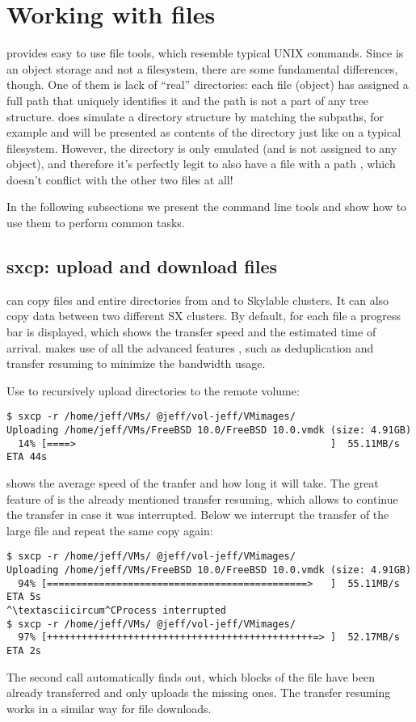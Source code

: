 \section{Working with files} \label{sec:files}
\SX provides easy to use file tools, which resemble typical UNIX commands.
Since \SX is an object storage and not a filesystem, there are some
fundamental differences, though. One of them is lack of ``real'' directories:
each file (object) has assigned a full path that uniquely identifies it and
the path is not a part of any tree structure. \SX does simulate a directory
structure by matching the subpaths, for example 
and  will be presented as contents of the directory
 just like on a typical filesystem. However, the directory
 is only emulated (and is not assigned to any object), and
therefore it's perfectly legit to also have a file with a path ,
which doesn't conflict with the other two files at all! 

In the following subsections we present the command line tools and show
how to use them to perform common tasks.

\subsection{sxcp: upload and download files}
 can copy files and entire directories from and to Skylable \SX
clusters. It can also copy data between two different SX clusters. By default,
for each file a progress bar is displayed, which shows the transfer speed and
the estimated time of arrival.  makes use of all the advanced features \SX,
such as deduplication and transfer resuming to minimize the bandwidth usage.

Use  to recursively upload directories to the remote volume:
\begin{lstlisting}
$ sxcp -r /home/jeff/VMs/ @jeff/vol-jeff/VMimages/
Uploading /home/jeff/VMs/FreeBSD 10.0/FreeBSD 10.0.vmdk (size: 4.91GB)
  14% [====>                                            ]  55.11MB/s ETA 44s
\end{lstlisting}
 shows the average speed of the tranfer and how long it will take.
The great feature of \SX is the already mentioned transfer resuming, which
allows to continue the transfer in case it was interrupted. Below we interrupt
the transfer of the large file and repeat the same copy again:
\begin{lstlisting}
$ sxcp -r /home/jeff/VMs/ @jeff/vol-jeff/VMimages/
Uploading /home/jeff/VMs/FreeBSD 10.0/FreeBSD 10.0.vmdk (size: 4.91GB)
  94% [=============================================>   ]  55.11MB/s ETA 5s
^\textasciicircum^CProcess interrupted
$ sxcp -r /home/jeff/VMs/ @jeff/vol-jeff/VMimages/
  97% [++++++++++++++++++++++++++++++++++++++++++++++=> ]  52.17MB/s ETA 2s
\end{lstlisting}
The second  call automatically finds out, which blocks of the file
have been already transferred and only uploads the missing ones. The transfer
resuming works in a similar way for file downloads.

